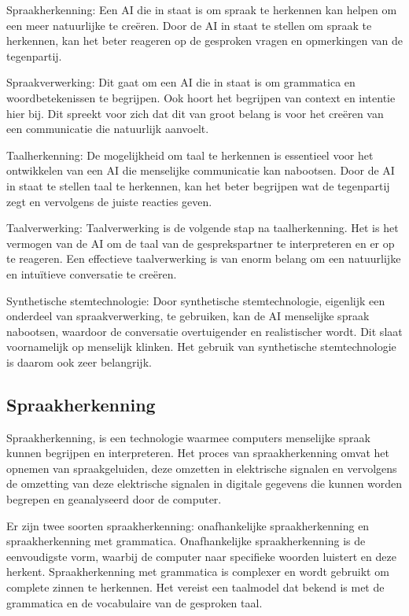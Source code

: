 Spraakherkenning: Een AI die in staat is om spraak te herkennen kan helpen om een meer natuurlijke te creëren. Door de AI in staat te stellen om spraak te herkennen, kan het beter reageren op de gesproken vragen en opmerkingen van de tegenpartij.

Spraakverwerking: Dit gaat om een AI die in staat is om grammatica en woordbetekenissen te begrijpen. Ook hoort het begrijpen van context en intentie hier bij. Dit spreekt voor zich dat dit van groot belang is voor het creëren van een communicatie die natuurlijk aanvoelt.

Taalherkenning: De mogelijkheid om taal te herkennen is essentieel voor het ontwikkelen van een AI die menselijke communicatie kan nabootsen. Door de AI in staat te stellen taal te herkennen, kan het beter begrijpen wat de tegenpartij zegt en vervolgens de juiste reacties geven.

Taalverwerking: Taalverwerking is de volgende stap na taalherkenning. Het is het vermogen van de AI om de taal van de gesprekspartner te interpreteren en er op te reageren. Een effectieve taalverwerking is van enorm belang om een natuurlijke en intuïtieve conversatie te creëren.

Synthetische stemtechnologie: Door synthetische stemtechnologie, eigenlijk een onderdeel van spraakverwerking, te gebruiken, kan de AI menselijke spraak nabootsen, waardoor de conversatie overtuigender en realistischer wordt. Dit slaat voornamelijk op menselijk klinken. Het gebruik van synthetische stemtechnologie is daarom ook zeer belangrijk.

\newpage

\subsection{Spraakherkenning}

Spraakherkenning, is een technologie waarmee computers menselijke spraak kunnen begrijpen en interpreteren. Het proces van spraakherkenning omvat het opnemen van spraakgeluiden, deze omzetten in elektrische signalen en vervolgens de omzetting van deze elektrische signalen in digitale gegevens die kunnen worden begrepen en geanalyseerd door de computer.

Er zijn twee soorten spraakherkenning: onafhankelijke spraakherkenning en spraakherkenning met grammatica. Onafhankelijke spraakherkenning is de eenvoudigste vorm, waarbij de computer naar specifieke woorden luistert en deze herkent. Spraakherkenning met grammatica is complexer en wordt gebruikt om complete zinnen te herkennen. Het vereist een taalmodel dat bekend is met de grammatica en de vocabulaire van de gesproken taal.

